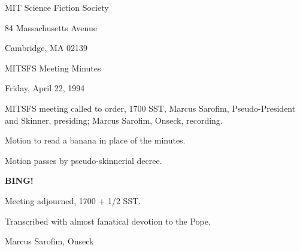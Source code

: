 \documentclass[12pt]{article}
\newcommand{\bing}{{\bf BING!} }
\begin{document}
\begin{center}

MIT Science Fiction Society 

84 Massachusetts Avenue

Cambridge, MA 02139

\vspace{12pt}

MITSFS Meeting Minutes 

Friday, April 22, 1994

\end{center}
 
\vspace{18pt}

\setlength{\parskip}{6pt}

\noindent
MITSFS meeting called to order, 1700 SST,
Marcus Sarofim, Pseudo-President and Skinner, presiding; Marcus Sarofim, Onseck, recording.

Motion to read a banana in place of the minutes.

Motion passes by pseudo-skinnerial decree.

\bing

\vspace{12pt}

\noindent
Meeting adjourned, 1700 + 1/2 SST.

\vspace{18pt}

\centerline{Transcribed with almost fanatical devotion to the Pope,}
\centerline{Marcus Sarofim, Onseck}
\end{document}
